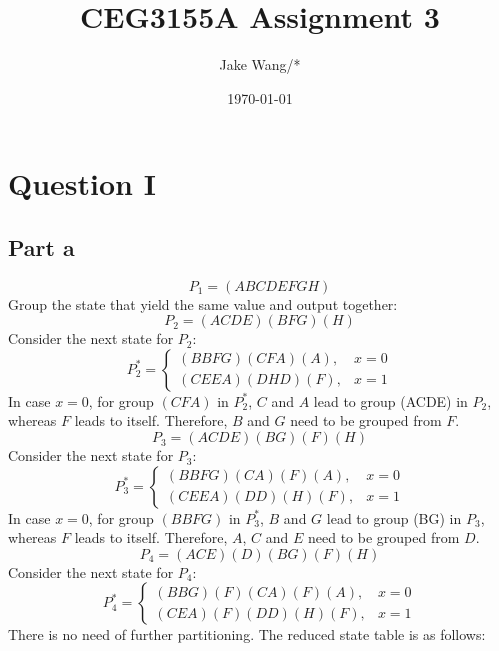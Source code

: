 \documentclass[12pt, a4paper]{article}
\title{CEG3155A Assignment 3}
\author{Jake Wang/*}
\date{\today}
\begin{document}
	\maketitle
	
	\section*{Question I}
	\subsection*{Part a}
	$$P_1 = (ABCDEFGH)$$
	Group the state that yield the same value and output together:
	$$P_2 = (ACDE)(BFG)(H)$$
	Consider the next state for $P_2$:
	\[
		P_2^* =
		\left.
		\begin{cases}
			(BBFG)(CFA)(A), & x = 0 \\
			(CEEA)(DHD)(F), & x = 1
		\end{cases}
		\right.
	\]
	In case $x = 0$, for group $(CFA)$ in $P_2^*$, $C$ and $A$ lead to group (ACDE) in $P_2$, whereas $F$ leads to itself. Therefore, $B$ and $G$ need to be grouped from $F$.
	$$P_3 = (ACDE)(BG)(F)(H)$$
	Consider the next state for $P_3$:
	\[
		P_3^* =
		\left.
		\begin{cases}
			(BBFG)(CA)(F)(A), & x = 0 \\
			(CEEA)(DD)(H)(F), & x = 1
		\end{cases}
		\right.
	\]
	In case $x = 0$, for group $(BBFG)$ in $P_3^*$, $B$ and $G$ lead to group (BG) in $P_3$, whereas $F$ leads to itself. Therefore, $A$, $C$ and $E$ need to be grouped from $D$.
	$$P_4 = (ACE)(D)(BG)(F)(H)$$
	Consider the next state for $P_4$:
	\[
		P_4^* =
		\left.
		\begin{cases}
			(BBG)(F)(CA)(F)(A), & x = 0 \\
			(CEA)(F)(DD)(H)(F), & x = 1
		\end{cases}
		\right.
	\]
	There is no need of further partitioning. The reduced state table is as follows:
	\begin{center}
	\end{center}
	
\end{document}
